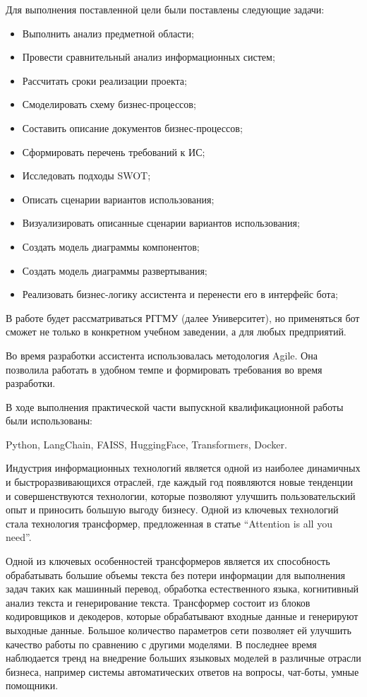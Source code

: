 Для выполнения поставленной цели были поставлены следующие задачи:
\begin{itemize}
    \item Выполнить анализ предметной области;
    \item Провести сравнительный анализ информационных систем;
    \item Рассчитать сроки реализации проекта;
    \item Смоделировать схему бизнес-процессов;
    \item Составить описание документов бизнес-процессов;
    \item Сформировать перечень требований к ИС;
    \item Исследовать подходы SWOT\@;
    \item Описать сценарии вариантов использования;
    \item Визуализировать описанные сценарии вариантов использования;
    \item Создать модель диаграммы компонентов;
    \item Создать модель диаграммы развертывания;
    \item Реализовать бизнес-логику ассистента и перенести его в интерфейс бота;
\end{itemize}

В работе будет рассматриваться РГГМУ (далее Университет), но применяться бот
сможет не только в конкретном учебном заведении, а для любых предприятий.

Во время разработки ассистента использовалась методология Agile. Она позволила
работать в удобном темпе и формировать требования во время разработки.

В ходе выполнения практической части выпускной квалификационной
работы были использованы:

Python, LangChain, FAISS, HuggingFace, Transformers, Docker.


Индустрия информационных технологий является одной из наиболее динамичных и 
быстроразвивающихся отраслей, где каждый год появляются новые тенденции и
совершенствуются технологии, которые позволяют улучшить пользовательский опыт 
и приносить большую выгоду бизнесу. Одной из ключевых технологий стала 
технология трансформер, предложенная в статье “Attention is all you need”.

Одной из ключевых особенностей трансформеров является их способность 
обрабатывать большие объемы текста без потери информации для выполнения задач
таких как машинный перевод, обработка естественного языка, когнитивный анализ
текста и генерирование текста. Трансформер состоит из блоков кодировщиков и
декодеров, которые обрабатывают входные данные и генерируют выходные данные.
Большое количество параметров сети позволяет ей улучшить качество работы по 
сравнению с другими моделями. В последнее время наблюдается тренд
на внедрение больших языковых моделей в различные отрасли бизнеса, например
системы автоматических ответов на вопросы, чат-боты, умные помощники. 

